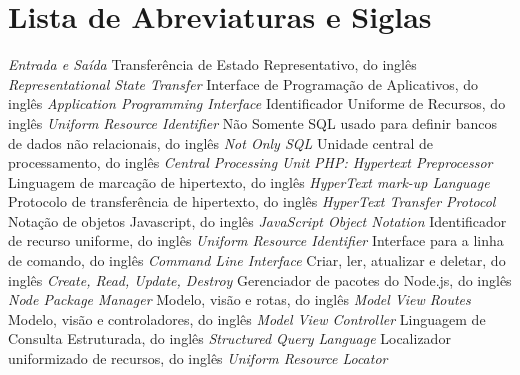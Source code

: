 \chapter*{Lista de Abreviaturas e Siglas}


\begin{acronym}
 {\textit{Entrada e Saída}}
 {Transferência de Estado Representativo, do inglês \textit{Representational State Transfer}}
 {Interface de Programação de Aplicativos, do inglês \textit{Application Programming Interface}}
 {Identificador Uniforme de Recursos, do inglês \textit{Uniform Resource Identifier}}
 {Não Somente SQL usado para definir bancos de dados não relacionais, do inglês \textit{Not Only SQL}}
 {Unidade central de processamento, do inglês \textit{Central Processing Unit}}
 {\textit{PHP: Hypertext Preprocessor}}
 {Linguagem de marcação de hipertexto, do inglês \textit{HyperText mark-up Language}}
 {Protocolo de transferência de hipertexto, do inglês \textit{HyperText Transfer Protocol}}
 {Notação de objetos Javascript, do inglês \textit{JavaScript Object Notation}}
 {Identificador de recurso uniforme, do inglês \textit{Uniform Resource Identifier}}
 {Interface para a linha de comando, do inglês \textit{Command Line Interface}}
 {Criar, ler, atualizar e deletar, do inglês \textit{Create, Read, Update, Destroy}}
 {Gerenciador de pacotes do Node.js, do inglês \textit{Node Package Manager}}
 {Modelo, visão e rotas, do inglês \textit{Model View Routes}}
 {Modelo, visão e controladores, do inglês \textit{Model View Controller}}
 {Linguagem de Consulta Estruturada, do inglês \textit{Structured Query Language}}
 {Localizador uniformizado de recursos, do inglês \textit{Uniform Resource Locator}}



\end{acronym}
